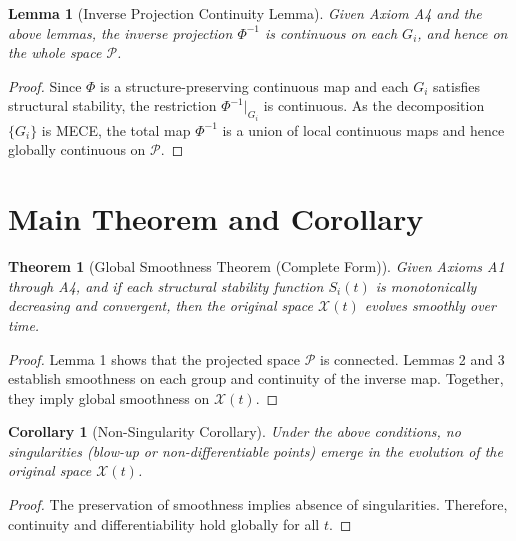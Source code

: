 \documentclass[11pt]{article}
\newtheorem{theorem}[definition]{Theorem}
\newtheorem{lemma}[definition]{Lemma}
\newtheorem{corollary}[definition]{Corollary}
\begin{document}
\begin{lemma}[Inverse Projection Continuity Lemma]
Given Axiom A4 and the above lemmas, the inverse projection \(\Phi^{-1}\) is continuous on each \(G_i\), and hence on the whole space \(\mathcal{P}\).
\end{lemma}

\begin{proof}
Since \(\Phi\) is a structure-preserving continuous map and each \(G_i\) satisfies structural stability, the restriction \(\Phi^{-1}|_{G_i}\) is continuous. As the decomposition \(\{G_i\}\) is MECE, the total map \(\Phi^{-1}\) is a union of local continuous maps and hence globally continuous on \(\mathcal{P}\).
\end{proof}

\section{Main Theorem and Corollary}

\begin{theorem}[Global Smoothness Theorem (Complete Form)]
Given Axioms A1 through A4, and if each structural stability function \(S_i(t)\) is monotonically decreasing and convergent, then the original space \(\mathcal{X}(t)\) evolves smoothly over time.
\end{theorem}

\begin{proof}
Lemma 1 shows that the projected space \(\mathcal{P}\) is connected. Lemmas 2 and 3 establish smoothness on each group and continuity of the inverse map. Together, they imply global smoothness on \(\mathcal{X}(t)\).
\end{proof}

\begin{corollary}[Non-Singularity Corollary]
Under the above conditions, no singularities (blow-up or non-differentiable points) emerge in the evolution of the original space \(\mathcal{X}(t)\).
\end{corollary}

\begin{proof}
The preservation of smoothness implies absence of singularities. Therefore, continuity and differentiability hold globally for all \(t\).
\end{proof}
\end{document}
